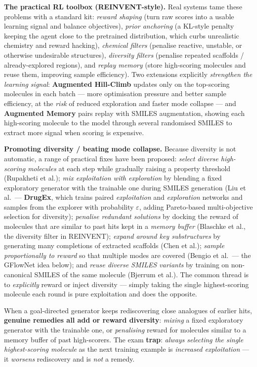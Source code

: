 \documentclass[11pt, oneside]{book}
\begin{document}
\medskip
\noindent\textbf{The practical RL toolbox (REINVENT-style).} Real systems tame these
problems with a standard kit: \emph{reward shaping} (turn raw scores into a usable
learning signal and balance objectives), \emph{prior anchoring} (a KL-style penalty
keeping the agent close to the pretrained distribution, which curbs unrealistic
chemistry and reward hacking), \emph{chemical filters} (penalise reactive, unstable, or
otherwise undesirable structures), \emph{diversity filters} (penalise repeated
scaffolds / already-explored regions), and \emph{replay memory} (store high-scoring
molecules and reuse them, improving sample efficiency). Two extensions explicitly
\emph{strengthen the learning signal}: \textbf{Augmented Hill-Climb} updates only on the
top-scoring molecules in each batch --- more optimisation pressure and better sample
efficiency, at the \emph{risk} of reduced exploration and faster mode collapse --- and
\textbf{Augmented Memory} pairs replay with SMILES augmentation, showing each
high-scoring molecule to the model through several randomised SMILES to extract more
signal when scoring is expensive.

\medskip
\noindent\textbf{Promoting diversity / beating mode collapse.} Because diversity is
not automatic, a range of practical fixes have been proposed: \emph{select diverse
high-scoring molecules} at each step while gradually raising a property threshold
(Rupakheti et al.); \emph{mix exploitation with exploration} by blending a fixed
exploratory generator with the trainable one during SMILES generation (Liu et al.\ ---
\textbf{DrugEx}, which trains paired \emph{exploitation} and \emph{exploration}
networks and samples from the explorer with probability $\varepsilon$, adding
Pareto-based multi-objective selection for diversity);
\emph{penalise redundant solutions} by docking the reward of molecules that are
similar to past hits kept in a \emph{memory buffer} (Blaschke et al., the diversity
filter in REINVENT); \emph{expand around key substructures} by generating many
completions of extracted scaffolds (Chen et al.); \emph{sample proportionally to
reward} so that multiple modes are covered (Bengio et al.\ --- the GFlowNet idea
below); and \emph{reuse diverse SMILES variants} by training on non-canonical SMILES
of the same molecule (Bjerrum et al.). The common thread is to \emph{explicitly}
reward or inject diversity --- simply taking the single highest-scoring molecule each
round is pure exploitation and does the opposite.

\begin{starbox}[title={\ensuremath{\bigstar}\, Combating analogue rediscovery}]
When a goal-directed generator keeps rediscovering close analogues of earlier hits,
\textbf{genuine remedies all add or reward diversity}: \emph{mixing} a fixed
exploratory generator with the trainable one, or \emph{penalising} reward for
molecules similar to a memory buffer of past high-scorers. The exam \textbf{trap}:
\emph{always selecting the single highest-scoring molecule} as the next training
example is \emph{increased exploitation} --- it \emph{worsens} rediscovery and is
\emph{not} a remedy.
\end{starbox}
\end{document}
